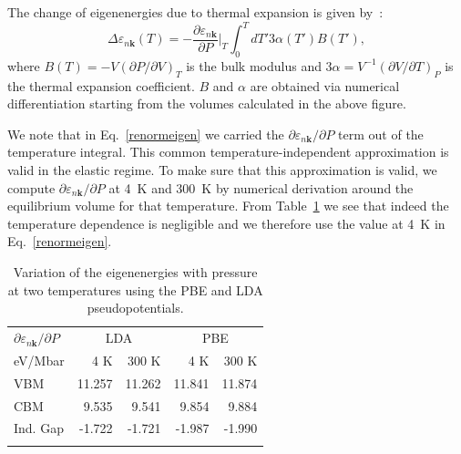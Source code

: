 \documentclass[aps,prl,twocolumn,superscriptaddress]{revtex4-1}
\begin{document}
The change of eigenenergies due to thermal expansion is given by~\cite{Lautenschlager1985}:
\begin{equation}\label{renormeigen}
\Delta \varepsilon_{n\mathbf{k}} (T) = - \frac{\partial \varepsilon_{n\mathbf{k}}}{\partial P} \Big|_{T} \int_0^T dT' 3\alpha(T') B(T'),
\end{equation}
where $B(T) = -V(\partial P/\partial V)_T$ is the bulk modulus and $3\alpha = V^{-1}(\partial V/\partial T)_P$ is the 
thermal expansion coefficient. $B$ and $\alpha$ are obtained via numerical differentiation
starting from the volumes calculated in the above figure. 

We note that in Eq.~\ref{renormeigen} we carried the $\partial \varepsilon_{n\mathbf{k}}/\partial P$ term out of the temperature 
integral. This common temperature-independent approximation is valid in the elastic regime. 
To make sure that this approximation is valid, we compute $\partial \varepsilon_{n\mathbf{k}}/\partial P$ at 4~K and 300~K
by numerical derivation around the equilibrium volume for that temperature. From Table~\ref{tableS1}
 we see that indeed the temperature dependence is negligible and we therefore use the value at 4~K in Eq.~\ref{renormeigen}.

\begin{table}
  \begin{tabular}{l r r r r }
  \toprule
$\partial \varepsilon_{n\mathbf{k}}/\partial P$ & \multicolumn{2}{c}{LDA} & \multicolumn{2}{c}{PBE} \\
eV/Mbar                                         &   4 K       & 300 K     & 4 K       & 300 K \\
  \hline
VBM     & 11.257  &  11.262  & 11.841  & 11.874 \\
CBM     &  9.535  &   9.541  &  9.854  &  9.884 \\
Ind. Gap & -1.722  &  -1.721  & -1.987  & -1.990 \\ 
  \botrule 
  \end{tabular}
  \caption{\label{tableS1}
   Variation of the eigenenergies with pressure at two temperatures using the PBE and LDA pseudopotentials. %
  }
\end{table}
\end{document}
